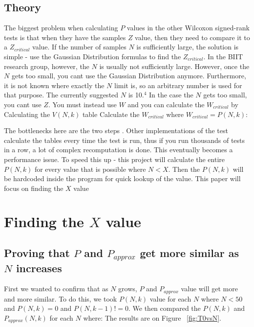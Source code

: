 \documentclass[12pt]{article}
\begin{document}
\subsection{Theory}
The biggest problem when calculating $P$ values in the other Wilcoxon signed-rank tests is that when they have the samples $Z$ value, then they need to compare it to a $Z_{critical}$ value. If the number of samples $N$ is sufficiently large, the solution is simple - use the Gaussian Distribution formulas to find the $Z_{critical}$. In the BIIT research group, however, the $N$ is usually not sufficiently large.
However, once the $N$ gets too small, you cant use the Gaussian Distribution anymore. Furthermore, it is not known where exactly the $N$ limit is, so an arbitrary number is used for that purpose. The currently suggested $N$ is 10.$^4$
In the case the $N$ gets too small, you cant use $Z$. You must instead use $W$ and you can calculate the $W_{critical}$ by
Calculating the $V(N, k)$ table
Calculate the $W_{critical}$ where $W_{critical} = P(N, k)$:

The bottlenecks here are the two steps . Other implementations of the test calculate the tables every time the test is run, thus if you run thousands of tests in a row, a lot of complex recomputation is done. This eventually becomes a performance issue.
To speed this up - this project will calculate the entire $P(N, k)$ for every value that is possible where $N < X$. Then the $P(N, k)$ will be hardcoded inside the program for quick lookup of the value.
This paper will focus on finding the $X$ value

\newpage

\section{Finding the $X$ value}
\subsection{Proving that $P$ and $P_{approx}$ get more similar as $N$ increases}
First we wanted to confirm that as $N$ grows, $P$ and $P_{approx}$ value will get more and more similar. To do this, we took $P(N, k)$ value for each $N$ where
$N < 50$ and $P(N, k)  = 0$ and $P(N, k - 1) != 0$.
We then compared the $P(N, k)$ and $P_{approx} (N, k)$ for each $N$ where:
The results are on Figure ~\ref{fig:T0vsN}.
\end{document}
